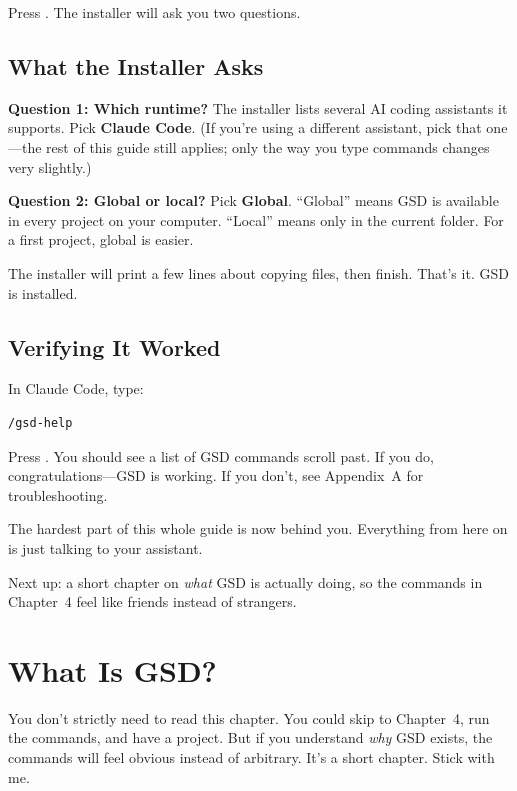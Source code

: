 \documentclass[11pt,letterpaper,openany]{book}
\begin{document}
Press . The installer will ask you two questions.

\section{What the Installer Asks}

\textbf{Question 1: Which runtime?} The installer lists several AI coding
assistants it supports. Pick \textbf{Claude Code}. (If you're using a
different assistant, pick that one---the rest of this guide still applies;
only the way you type commands changes very slightly.)

\textbf{Question 2: Global or local?} Pick \textbf{Global}. ``Global''
means GSD is available in every project on your computer. ``Local'' means
only in the current folder. For a first project, global is easier.

The installer will print a few lines about copying files, then finish.
That's it. GSD is installed.

\section{Verifying It Worked}

In Claude Code, type:

\begin{lstlisting}
/gsd-help
\end{lstlisting}

Press . You should see a list of GSD commands scroll past.
If you do, congratulations---GSD is working. If you don't, see
Appendix~A for troubleshooting.

\begin{gsdsuccess}
The hardest part of this whole guide is now behind you. Everything from
here on is just talking to your assistant.
\end{gsdsuccess}

\bigskip
\noindent Next up: a short chapter on \emph{what} GSD is actually doing,
so the commands in Chapter~4 feel like friends instead of strangers.

\chapter{What Is GSD?}

You don't strictly need to read this chapter. You could skip to Chapter~4,
run the commands, and have a project. But if you understand \emph{why} GSD
exists, the commands will feel obvious instead of arbitrary. It's a short
chapter. Stick with me.
\end{document}
